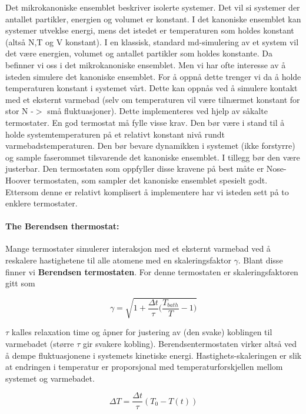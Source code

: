 \documentclass[a4paper,10pt]{article}
\begin{document}
Det mikrokanoniske ensemblet beskriver isolerte systemer. Det vil si systemer der antallet partikler, energien og volumet er konstant. I det kanoniske ensemblet kan systemer utveklse energi, mens det istedet er temperaturen som holdes konstant (altså N,T og V konstant). I en klassisk, standard md-simulering av et system vil det være energien, volumet og antallet partikler som holdes konstante. Da befinner vi oss i det mikrokanoniske ensemblet. Men vi har ofte interesse av å isteden simulere det kanoniske ensemblet. For å oppnå dette trenger vi da å holde temperaturen konstant i systemet vårt. Dette kan oppnås ved å simulere kontakt med et eksternt varmebad (selv om temperaturen vil være tilnærmet konstant for stor N -$>$ små fluktuasjoner). Dette implementeres ved hjelp av såkalte termostater. En god termostat må fylle visse krav. Den bør være i stand til å holde systemtemperaturen på et relativt konstant nivå rundt varmebadstemperaturen. Den bør bevare dynamikken i systemet (ikke forstyrre) og sample faserommet tilsvarende det kanoniske ensemblet. I tillegg bør den være justerbar. Den termostaten som oppfyller disse kravene på best måte er Nose-Hoover termostaten, som sampler det kanoniske ensemblet spesielt godt. Ettersom denne er relativt komplisert å implementere har vi isteden sett på to enklere termostater. 

\paragraph{The Berendsen thermostat:}
Mange termostater simulerer interaksjon med et eksternt varmebad ved å reskalere hastighetene til alle atomene med en skaleringsfaktor $\gamma$. Blant disse finner vi \textbf{Berendsen termostaten}. For denne termostaten er skaleringsfaktoren gitt som 

\begin{equation}
 \gamma = \sqrt{1+\frac{\Delta t}{\tau}\bigg(\frac{T_{bath}}{T}-1\bigg)}
\end{equation}

$\tau$ kalles relaxation time og åpner for justering av (den svake) koblingen til varmebadet (større $\tau$ gir svakere kobling). Berendsentermostaten virker altså ved å dempe fluktuasjonene i systemets kinetiske energi. Hastighets-skaleringen er slik at endringen i temperatur er proporsjonal med temperaturforskjellen mellom systemet og varmebadet.

\begin{equation}
 \Delta T = \frac{\Delta t}{\tau}(T_0 -T(t))
\end{equation}
\end{document}
